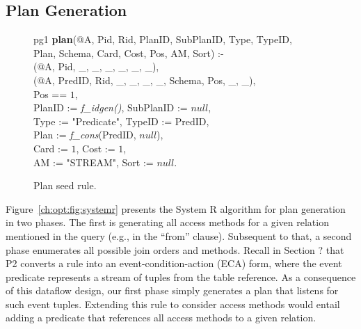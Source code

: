 \subsection{Plan Generation}
\label{ch:opt:sec:plangen}

\begin{figure*}
\ssp
\centering
\begin{boxedminipage}{\linewidth}
pg1 {\bf plan}(@A, Pid, Rid, PlanID, SubPlanID, Type, TypeID, \\
\datalogspace \xspace \xspace Plan, Schema, Card, Cost, Pos, AM, Sort) :- \\
(@A, Pid, \_, \_, \_, \_, \_, \_),\\
(@A, PredID, Rid, \_, \_, \_, \_, Schema, Pos, \_, \_),\\
\datalogspace Pos == $1$,\\
\datalogspace PlanID := {\em f\_idgen()}, SubPlanID := $null$,\\
\datalogspace Type := "Predicate", TypeID := PredID,\\
\datalogspace Plan := {\em f\_cons}(PredID, $null$),\\
\datalogspace Card := $1$, Cost := $1$,\\
\datalogspace AM := "STREAM", Sort := $null$.
\end{boxedminipage}
\caption{\label{ch:opt:fig:planseed}Plan seed rule.}
\end{figure*}

Figure~\ref{ch:opt:fig:systemr} presents the System R algorithm for plan
generation in two phases.  The first is generating all access methods for a
given relation mentioned in the query (e.g., in the ``from'' clause).
Subsequent to that, a second phase enumerates all possible join orders and
methods.  Recall in Section ? that P2 converts a rule into an
event-condition-action (ECA) form, where the event predicate represents a
stream of tuples from the table reference.  As a consequence of this dataflow
design, our first phase simply generates a plan that listens for such event
tuples.  Extending this rule to consider access methods would entail adding a
predicate that references all access methods to a given relation.

